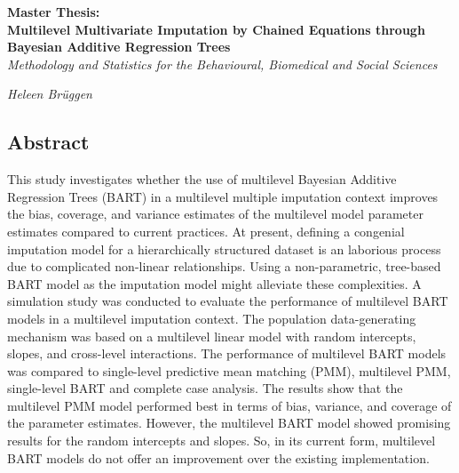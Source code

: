 \documentclass[10pt, a4paper, titlepage]{article}
\begin{document}
\begin{titlingpage}
\begin{center}
\Huge\textbf{Master Thesis:  \\ Multilevel Multivariate Imputation by Chained Equations through Bayesian Additive Regression Trees} \\
\Large\textit{Methodology and Statistics for the Behavioural, Biomedical and Social Sciences}

\vspace{.5cm}

\normalsize\textit{Heleen Brüggen}

\vspace{1cm}

\begin{minipage}{1\textwidth}
\begin{center}
\section*{Abstract}
\end{center}
\end{minipage}

\vspace{.25cm}

\begin{minipage}{1\textwidth}
    This study investigates whether the use of multilevel Bayesian Additive Regression Trees (BART) in a multilevel multiple imputation context improves the bias, coverage, and variance estimates of the multilevel model parameter estimates compared to current practices. At present, defining a congenial imputation model for a hierarchically structured dataset is an laborious process due to complicated non-linear relationships. Using a non-parametric, tree-based BART model as the imputation model might alleviate these complexities. A simulation study was conducted to evaluate the performance of multilevel BART models in a multilevel imputation context. The population data-generating mechanism was based on a multilevel linear model with random intercepts, slopes, and cross-level interactions. The performance of multilevel BART models was compared to single-level predictive mean matching (PMM), multilevel PMM, single-level BART and complete case analysis. The results show that the multilevel PMM model performed best in terms of bias, variance, and coverage of the parameter estimates. However, the multilevel BART model showed promising results for the random intercepts and slopes. So, in its current form, multilevel BART models do not offer an improvement over the existing implementation.
\end{minipage}


\end{center}
\end{titlingpage}
\end{document}
